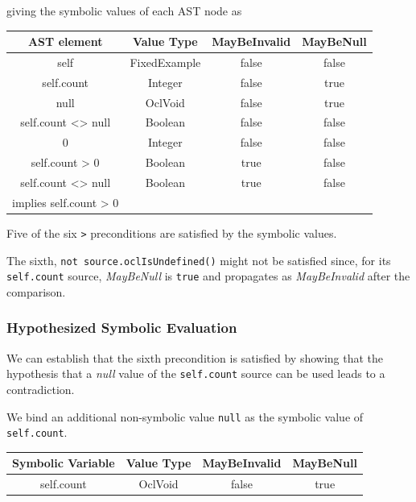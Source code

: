 \documentclass[
]{ceurart}
\begin{document}
giving the symbolic values of each AST node as

\begin{center}
	\begin{tabular}{|c||c|c|c|}
		\hline
		AST element & Value Type & MayBeInvalid & MayBeNull \\
		\hline
		\hline
		self & FixedExample & false & false \\
		\hline
		self.count & Integer & false & true\\
		\hline
		null & OclVoid & false & true \\ 
		\hline
		self.count <> null & Boolean & false & false \\
		\hline
		0 & Integer & false & false \\
		\hline
		self.count > 0 & Boolean & true & false \\
		\hline
		self.count <> null & Boolean & true & false \\
		implies self.count > 0 & & & \\
		\hline
	\end{tabular}
\end{center}

Five of the six \verb|>| preconditions are satisfied by the symbolic values.

The sixth, \verb|not source.oclIsUndefined()| might not be satisfied since, for its \verb|self.count| source, \emph{MayBeNull} is \verb|true| and propagates as \emph{MayBeInvalid} after the comparison.

\subsubsection{Hypothesized Symbolic Evaluation}

We can establish that the sixth precondition is satisfied by showing that the hypothesis that a \emph{null} value of the \verb|self.count| source can be used leads to a contradiction. 

We bind an additional non-symbolic value \verb|null| as the symbolic value of \verb|self.count|.

\begin{center}
	\begin{tabular}{|c||c|c||c|}
		\hline
		Symbolic Variable & Value Type & MayBeInvalid & MayBeNull \\
		\hline
		self.count & OclVoid & false & true \\
		\hline
	\end{tabular}
\end{center} 
\end{document}
